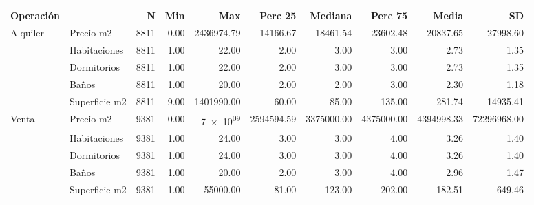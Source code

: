 \begin{table}
\centering
\begin{tabular}[t]{llrrrrrrrr}
\toprule
Operación &   & N & Min & Max & Perc 25 & Mediana & Perc 75 & Media & SD\\
\midrule
Alquiler & Precio m2 & 8811 & \num{0.00} & \num{2436974.79} & \num{14166.67} & \num{18461.54} & \num{23602.48} & \num{20837.65} & \num{27998.60}\\
 & Habitaciones & 8811 & \num{1.00} & \num{22.00} & \num{2.00} & \num{3.00} & \num{3.00} & \num{2.73} & \num{1.35}\\
 & Dormitorios & 8811 & \num{1.00} & \num{22.00} & \num{2.00} & \num{3.00} & \num{3.00} & \num{2.73} & \num{1.35}\\
 & Baños & 8811 & \num{1.00} & \num{20.00} & \num{2.00} & \num{2.00} & \num{3.00} & \num{2.30} & \num{1.18}\\
 & Superficie m2 & 8811 & \num{9.00} & \num{1401990.00} & \num{60.00} & \num{85.00} & \num{135.00} & \num{281.74} & \num{14935.41}\\
Venta & Precio m2 & 9381 & \num{0.00} & \num{7e+09} & \num{2594594.59} & \num{3375000.00} & \num{4375000.00} & \num{4394998.33} & \num{72296968.00}\\
 & Habitaciones & 9381 & \num{1.00} & \num{24.00} & \num{3.00} & \num{3.00} & \num{4.00} & \num{3.26} & \num{1.40}\\
 & Dormitorios & 9381 & \num{1.00} & \num{24.00} & \num{3.00} & \num{3.00} & \num{4.00} & \num{3.26} & \num{1.40}\\
 & Baños & 9381 & \num{1.00} & \num{20.00} & \num{2.00} & \num{3.00} & \num{4.00} & \num{2.96} & \num{1.47}\\
 & Superficie m2 & 9381 & \num{1.00} & \num{55000.00} & \num{81.00} & \num{123.00} & \num{202.00} & \num{182.51} & \num{649.46}\\
\bottomrule
\end{tabular}
\end{table}
